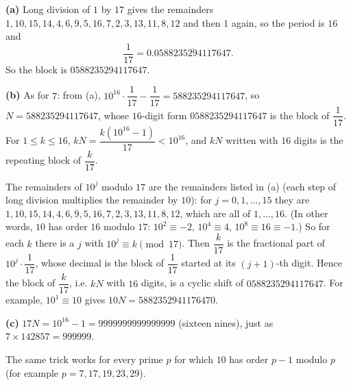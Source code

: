 \textbf{(a)} Long division of $1$ by $17$ gives the remainders $1,10,15,14,4,6,9,5,16,7,2,3,13,11,8,12$ and then $1$ again, so the period is $16$ and
\[
\dfrac{1}{17}=0.\overline{0588235294117647}.
\]
So the block is $\boxed{0588235294117647}$.

\textbf{(b)} As for $7$: from (a), $10^{16}\cdot\dfrac{1}{17}-\dfrac{1}{17}=588235294117647$, so $N=588235294117647$, whose $16$-digit form $0588235294117647$ is the block of $\dfrac{1}{17}$. For $1\le k\le16$, $kN=\dfrac{k(10^{16}-1)}{17}<10^{16}$, and $kN$ written with $16$ digits is the repeating block of $\dfrac {k}{17}$.

The remainders of $10^j$ modulo $17$ are the remainders listed in (a) (each step of long division multiplies the remainder by $10$): for $j=0,1,\dots,15$ they are $1,10,15,14,4,6,9,5,16,7,2,3,13,11,8,12$, which are all of $1,\dots,16$. (In other words, $10$ has order $16$ modulo $17$: $10^2\equiv-2$, $10^4\equiv4$, $10^8\equiv16\equiv-1$.) So for each $k$ there is a $j$ with $10^j\equiv k\pmod{17}$. Then $\dfrac {k}{17}$ is the fractional part of $10^j\cdot\dfrac{1}{17}$, whose decimal is the block of $\dfrac{1}{17}$ started at its $(j+1)$-th digit. Hence the block of $\dfrac {k}{17}$, i.e. $kN$ with $16$ digits, is a cyclic shift of $0588235294117647$. For example, $10^1\equiv10$ gives $10N=5882352941176470$.

\textbf{(c)} $17N=10^{16}-1=\boxed{9999999999999999}$ (sixteen nines), just as $7\times142857=999999$.

The same trick works for every prime $p$ for which $10$ has order $p-1$ modulo $p$ (for example $p=7,17,19,23,29$).
